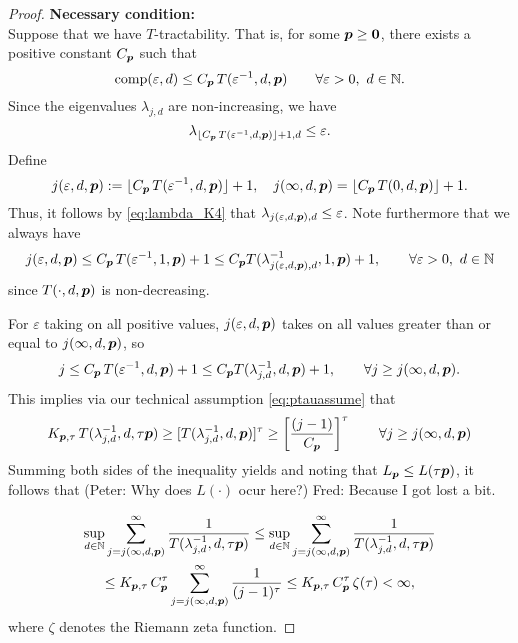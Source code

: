 \documentclass[11pt,a4paper]{article}
\newcommand{\fred}[1]{\begingroup\color{blue}Fred: #1\endgroup}
\newcommand{\peter}[1]{\begingroup\color{purple}#1\endgroup}
\begin{document}
\begin{proof}
\noindent \textbf{Necessary condition:}\\
Suppose that we have
$T$-tractability. That is, for some $\boldsymbol{p} \ge \boldsymbol{0}$, there exists a positive constant $C_{\boldsymbol{p}}$ such that
\[
\operatorname{comp}(\varepsilon,d)\le C_{\boldsymbol{p}}\, T(\varepsilon^{-1},d,\boldsymbol{p}) \qquad \forall \varepsilon > 0,  \ d \in \mathbb{N}.
\]
Since the eigenvalues $\lambda_{j,d}$ are non-increasing, we have
\begin{equation}\label{eq:lambda_K4}
	\lambda_{\lfloor C_{\boldsymbol{p}}\, T(\varepsilon^{-1},d,\boldsymbol{p})\rfloor +1,d}\le \varepsilon.
\end{equation}
Define
\[
j (\varepsilon,d,\boldsymbol{p}):= \lfloor C_{\boldsymbol{p}}\, T(\varepsilon^{-1},d,\boldsymbol{p})\rfloor +1, \quad
j (\infty,d,\boldsymbol{p}) = \lfloor C_{\boldsymbol{p}}\, T(0,d,\boldsymbol{p})\rfloor +1.
\]
Thus, it follows by \eqref{eq:lambda_K4} that $\lambda_{j(\varepsilon,d,\boldsymbol{p}),d} \le \varepsilon$.
Note furthermore that we always have
\[
j(\varepsilon,d,\boldsymbol{p})\le C_{\boldsymbol{p}}\, T(\varepsilon^{-1},1,\boldsymbol{p})+1 \le C_{\boldsymbol{p}} T(\lambda_{j(\varepsilon,d,\boldsymbol{p}),d}^{-1},1,\boldsymbol{p})+1, \qquad \forall \varepsilon > 0, \ d \in \mathbb{N}
\]
since
$T(\cdot,d,\boldsymbol{p})$ is non-decreasing.

For $\varepsilon$ taking on all positive values, $j(\varepsilon,d,\boldsymbol{p})$ takes on all values greater than or equal to $j(\infty,d,\boldsymbol{p})$, so
\[
j\le C_{\boldsymbol{p}}\, T(\varepsilon^{-1},d,\boldsymbol{p})+1 \le C_{\boldsymbol{p}} T(\lambda_{j,d}^{-1},d,\boldsymbol{p})+1, \qquad \forall j \ge j(\infty,d,\boldsymbol{p}).
\]
This implies via our technical assumption \eqref{eq:ptauassume} that
\begin{equation*}
	K_{\boldsymbol{p},\tau}\,T (\lambda_{j,d}^{-1},d,\tau \boldsymbol{p}) \ge
	[T(\lambda_{j,d}^{-1},d, \boldsymbol{p})]^\tau
	\ge
	\left[\frac{(j-1)}{C_{\boldsymbol{p}}}\right]^\tau \qquad \forall j \ge j(\infty,d,\boldsymbol{p})
\end{equation*}
Summing both sides of the inequality yields and noting that $L_{\boldsymbol{p}} \le L(\tau\boldsymbol{p})$, it follows that
\peter{(Peter: Why does $L(\cdot)$ ocur here?)} \fred{Because I got lost a bit.}

\begin{multline*}
	\sup_{d\in\mathbb{N}} \sum_{j=j(\infty,d,\boldsymbol{p})}^\infty \frac{1}{T (\lambda_{j,d}^{-1},d, \tau \boldsymbol{p})} \le
	\sup_{d\in\mathbb{N}} \sum_{j=j(\infty,d,\boldsymbol{p})}^\infty \frac{1}{T (\lambda_{j,d}^{-1},d, \tau \boldsymbol{p})} \\
	\le K_{\boldsymbol{p},\tau}\, C_{\boldsymbol{p}}^\tau
	\sum_{j=j(\infty,d,\boldsymbol{p})}^\infty \frac{1}{(j-1)^\tau} \le
	K_{\boldsymbol{p},\tau}\, C_{\boldsymbol{p}}^\tau\, \zeta (\tau) < \infty,
\end{multline*}
where $\zeta$ denotes the Riemann zeta function.



\end{proof}
\end{document}
